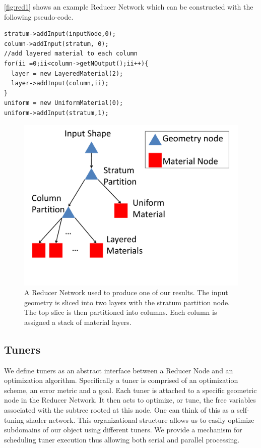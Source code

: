 \documentclass[annual]{acmsiggraph}
\begin{document}
\autoref{fig:red1} shows an example Reducer Network which can be constructed with the following pseudo-code.
\begin{verbatim}
stratum->addInput(inputNode,0);
column->addInput(stratum, 0);
//add layered material to each column
for(ii =0;ii<column->getNOutput();ii++){
  layer = new LayeredMaterial(2);
  layer->addInput(column,ii);
}
uniform = new UniformMaterial(0);
uniform->addInput(stratum,1);
\end{verbatim}

\begin{figure}[h]
\includegraphics[scale=0.3]{figure/redNetwork.pdf}
\caption{A Reducer Network used to produce one of our results.
The input geometry is sliced into two layers with the stratum partition node.
The top slice is then partitioned into columns. Each column is assigned
a stack of material layers.}
\label{fig:red1}
\end{figure}

\subsection{Tuners}
We define tuners as an abstract interface between a Reducer Node and an optimization algorithm.  Specifically a tuner is comprised of an optimization scheme, an error metric and a goal. Each tuner is attached to a specific geometric node in the Reducer Network. It then acts to optimize, or tune, the free variables associated with the subtree rooted at this node. One can think of this as a self-tuning shader network.  This organizational structure allows us to easily optimize subdomains of our object using different tuners. We provide a mechanism for scheduling tuner execution thus allowing both serial and parallel processing. 
\end{document}

